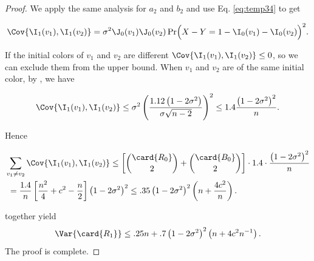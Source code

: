 \documentclass{toc}
\begin{document}
\begin{proof}
				\noindent We apply the same analysis for $a_2$ and $b_2$ and use Eq. \eqref{eq:temp34} to get
				\begin{linenomath}\begin{equation*}
						\Cov{\I_1(v_1), \I_1(v_2)} = \sigma^2 \J_0(v_1)\J_0(v_2) \Pr\Bigl(X - Y = 1 - \I_0(v_1) - \I_0(v_2)\Bigr)^2.
				\end{equation*}\end{linenomath}
				If the initial colors of $v_1$ and $v_2$ %
				are %
				different  %
				$\Cov{\I_1(v_1), \I_1(v_2)} \le  0$,
				so we can exclude them from the upper bound.
				When $v_1$ and $v_2$ are of the same initial color, by , we have
				\begin{linenomath}\begin{equation*}
						\Cov{\I_1(v_1), \I_1(v_2)} \le \sigma^2 \left(\frac{1.12\left(1 - 2\sigma^2\right)}{\sigma\sqrt{n - 2}}\right)^2
						\le 1.4\frac{\left(1 - 2\sigma^2\right)^2}{n}.
				\end{equation*}\end{linenomath}
				Hence
				\begin{linenomath}\begin{equation*} \label{eq:day-1-covariance}
						\begin{aligned}
							& \sum_{v_1\neq v_2} \Cov{\I_1(v_1), \I_1(v_2)}
							\le \left[\binom{\card{R_0}}{2} + \binom{\card{B_0}}{2}\right]
							\cdot 1.4\cdot \frac{\left(1 - 2\sigma^2\right)^2}{n} \\
							& \ = \frac{1.4}{n} \left[\frac{n^2}{4} + c^2 - \frac{n}{2}\right] \left(1 - 2\sigma^2\right)^2
							\le .35\left(1 - 2\sigma^2\right)^2 \left(n + \frac{4c^2}{n}\right).
						\end{aligned}
				\end{equation*}\end{linenomath}
				  together yield
				\begin{equation} \label{eq:variance-bound}
					\Var{\card{R_1}} \le .25n + .7\left(1 - 2\sigma^2\right)^2 \left(n + 4c^2n^{-1}\right).
				\end{equation}
				The proof is complete.
			\end{proof}
			
\end{document}
